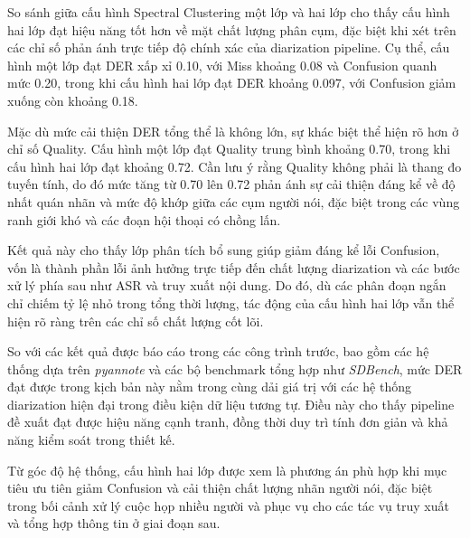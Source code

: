 So sánh giữa cấu hình Spectral Clustering một lớp và hai lớp cho thấy cấu hình hai lớp đạt hiệu năng tốt hơn về mặt chất lượng phân cụm, đặc biệt khi xét trên các chỉ số phản ánh trực tiếp độ chính xác của diarization pipeline. Cụ thể, cấu hình một lớp đạt DER xấp xỉ 0.10, với Miss khoảng 0.08 và Confusion quanh mức 0.20, trong khi cấu hình hai lớp đạt DER khoảng 0.097, với Confusion giảm xuống còn khoảng 0.18.

Mặc dù mức cải thiện DER tổng thể là không lớn, sự khác biệt thể hiện rõ hơn ở chỉ số Quality. Cấu hình một lớp đạt Quality trung bình khoảng 0.70, trong khi cấu hình hai lớp đạt khoảng 0.72. Cần lưu ý rằng Quality không phải là thang đo tuyến tính, do đó mức tăng từ 0.70 lên 0.72 phản ánh sự cải thiện đáng kể về độ nhất quán nhãn và mức độ khớp giữa các cụm người nói, đặc biệt trong các vùng ranh giới khó và các đoạn hội thoại có chồng lấn.

Kết quả này cho thấy lớp phân tích bổ sung giúp giảm đáng kể lỗi Confusion, vốn là thành phần lỗi ảnh hưởng trực tiếp đến chất lượng diarization và các bước xử lý phía sau như ASR và truy xuất nội dung. Do đó, dù các phân đoạn ngắn chỉ chiếm tỷ lệ nhỏ trong tổng thời lượng, tác động của cấu hình hai lớp vẫn thể hiện rõ ràng trên các chỉ số chất lượng cốt lõi.

So với các kết quả được báo cáo trong các công trình trước, bao gồm các hệ thống dựa trên \textit{pyannote} và các bộ benchmark tổng hợp như \textit{SDBench}\cite{sdbench}, mức DER đạt được trong kịch bản này nằm trong cùng dải giá trị với các hệ thống diarization hiện đại trong điều kiện dữ liệu tương tự. Điều này cho thấy pipeline đề xuất đạt được hiệu năng cạnh tranh, đồng thời duy trì tính đơn giản và khả năng kiểm soát trong thiết kế.

Từ góc độ hệ thống, cấu hình hai lớp được xem là phương án phù hợp khi mục tiêu ưu tiên giảm Confusion và cải thiện chất lượng nhãn người nói, đặc biệt trong bối cảnh xử lý cuộc họp nhiều người và phục vụ cho các tác vụ truy xuất và tổng hợp thông tin ở giai đoạn sau.


